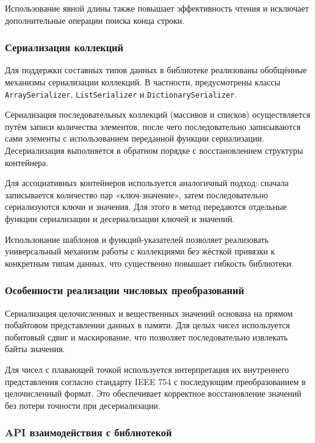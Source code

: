 \documentclass[coursework]{SCWorks}
\begin{document}
Использование явной длины также повышает эффективность чтения и исключает дополнительные операции поиска конца строки.

\subsubsection{Сериализация коллекций}

Для поддержки составных типов данных в библиотеке реализованы обобщённые механизмы сериализации коллекций. В частности, предусмотрены классы \texttt{ArraySerializer}, \texttt{ListSerializer} и \texttt{DictionarySerializer}.

Сериализация последовательных коллекций (массивов и списков) осуществляется путём записи количества элементов, после чего последовательно записываются сами элементы с использованием переданной функции сериализации. Десериализация выполняется в обратном порядке с восстановлением структуры контейнера.

Для ассоциативных контейнеров используется аналогичный подход: сначала записывается количество пар «ключ-значение», затем последовательно сериализуются ключи и значения. Для этого в метод передаются отдельные функции сериализации и десериализации ключей и значений.

Использование шаблонов и функций-указателей позволяет реализовать универсальный механизм работы с коллекциями без жёсткой привязки к конкретным типам данных, что существенно повышает гибкость библиотеки.

\subsubsection{Особенности реализации числовых преобразований}

Сериализация целочисленных и вещественных значений основана на прямом побайтовом представлении данных в памяти. Для целых чисел используется побитовый сдвиг и маскирование, что позволяет последовательно извлекать байты значения.

Для чисел с плавающей точкой используется интерпретация их внутреннего представления согласно стандарту IEEE 754 с последующим преобразованием в целочисленный формат. Это обеспечивает корректное восстановление значений без потери точности при десериализации.

\subsubsection{API взаимодействия с библиотекой}
\end{document}
